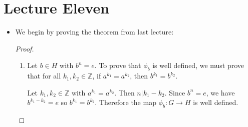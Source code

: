 \section{Lecture Eleven}
\begin{itemize}
    \item We begin by proving the theorem from last lecture:
    \begin{proof}
        \begin{enumerate}
            \item Let $b\in H$ with $b^n = e$. To prove that $\phi_b$ is well defined, we must prove that for all $k_1,k_2 \in \mathbb{Z}$, if $a^{k_1}=a^{k_2}$, then $b^{k_1}=b^{k_2}$.
            
            Let $k_1,k_2 \in \mathbb{Z}$ with $a^{k_1}=a^{k_2}$. Then $n | k_1- k_2$. Since $b^n=e$, we have $b^{k_1-k_2}=e$ so $b^{k_1}=b^{k_2}$. Therefore the map $\phi_b: G\rightarrow H$ is well defined.


\end{enumerate}
\end{proof}
\end{itemize}
